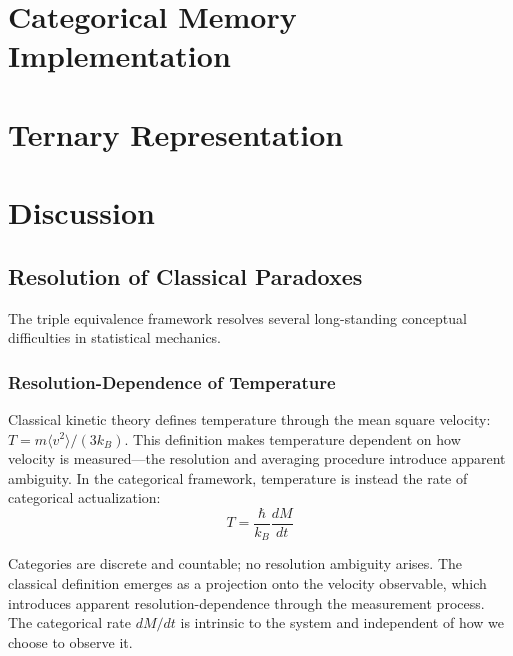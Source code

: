 \section{Categorical Memory Implementation}
\label{sec:categorical_memory}



\section{Ternary Representation}
\label{sec:ternary}




\section{Discussion}
\label{sec:discussion}

\subsection{Resolution of Classical Paradoxes}

The triple equivalence framework resolves several long-standing conceptual difficulties in statistical mechanics.

\subsubsection{Resolution-Dependence of Temperature}

Classical kinetic theory defines temperature through the mean square velocity: $T = m\langle v^2\rangle/(3k_B)$. This definition makes temperature dependent on how velocity is measured---the resolution and averaging procedure introduce apparent ambiguity. In the categorical framework, temperature is instead the rate of categorical actualization:
\begin{equation}
T = \frac{\hbar}{k_B}\frac{dM}{dt}
\end{equation}

Categories are discrete and countable; no resolution ambiguity arises. The classical definition emerges as a projection onto the velocity observable, which introduces apparent resolution-dependence through the measurement process. The categorical rate $dM/dt$ is intrinsic to the system and independent of how we choose to observe it.

